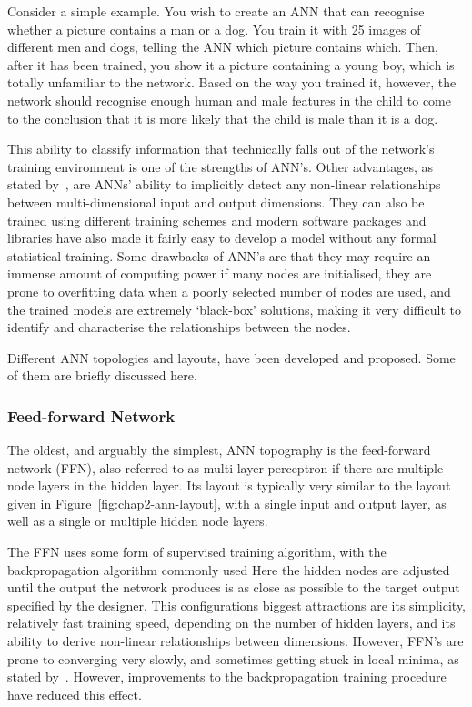 Consider a simple example. You wish to create an ANN that can recognise whether a picture contains a man or a dog. You train it with 25 images of different men and dogs, telling the ANN which picture contains which. Then, after it has been trained, you show it a picture containing a young boy, which is totally unfamiliar to the network. Based on the way you trained it, however, the network should recognise enough human and male features in the child to come to the conclusion that it is more likely that the child is male than it is a dog. 

This ability to classify information that technically falls out of the network's training environment is one of the strengths of ANN's. Other advantages, as stated by~\cite{tu1996advantages}, are ANNs' ability to implicitly detect any non-linear relationships between multi-dimensional input and output dimensions. They can also be trained using different training schemes and modern software packages and libraries have also made it fairly easy to develop a model without any formal statistical training. Some drawbacks of ANN's are that they may require an immense amount of computing power if many nodes are initialised, they are prone to overfitting data when a poorly selected number of nodes are used, and the trained models are extremely `black-box' solutions, making it very difficult to identify and characterise the relationships between the nodes. 

Different ANN topologies and layouts, have been developed and proposed. Some of them are briefly discussed here.

\subsubsection{Feed-forward Network}

The oldest, and arguably the simplest, ANN topography is the feed-forward network (FFN), also referred to as multi-layer perceptron if there are multiple node layers in the hidden layer. Its layout is typically very similar to the layout given in Figure~\ref{fig:chap2-ann-layout}, with a single input and output layer, as well as a single or multiple hidden node layers. 

The FFN uses some form of supervised training algorithm, with the backpropagation algorithm commonly used Here the hidden nodes are adjusted until the output the network produces is as close as possible to the target output specified by the designer. This configurations biggest attractions are its simplicity, relatively fast training speed, depending on the number of hidden layers, and its ability to derive non-linear relationships between dimensions. However, FFN's are prone to converging very slowly, and sometimes getting stuck in local minima, as stated by~\cite{svozil1997introduction}. However, improvements to the backpropagation training procedure have reduced this effect.

